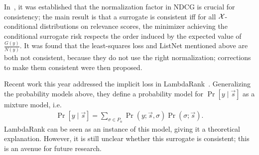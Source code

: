 In~\cite{ndcg-consistency}, it was established that the normalization factor
in NDCG is crucial for consistency; the main result is that a surrogate is
consistent iff for all ${\mathcal X}$-conditional distributions on relevance scores,
the minimizer achieving the conditional surrogate risk
respects the order induced by the expected value of $\frac{G(y)}{N(y)}$.
It was found that the
least-squares loss and ListNet mentioned above are both not consistent, because
they do not use the right normalization; corrections to make them consistent
were then proposed.

Recent work this year addressed the implicit loss in LambdaRank~\cite{cikm}.
Generalizing the probability models above, they define a probability model for
$\Pr[y \mid \vec{s}]$ as a mixture model, i.e.\
\begin{align*}
  \Pr[y \mid \vec{s}] = \sum_{\sigma \in P_n} \Pr(y ; \vec{s}, \sigma) \Pr(\sigma ; \vec{s}).
\end{align*}
LambdaRank can be seen as an instance of this model, giving it a theoretical
explanation. 
However, it is still unclear whether this surrogate is consistent; this is an
avenue for future research. 
